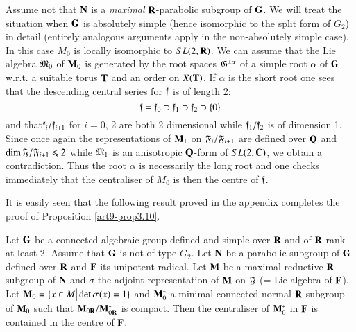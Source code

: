 Assume not that $\mathbf{N}$ is a \textit{maximal} $\mathbf{R}$-parabolic subgroup of $\mathbf{G}$. We will treat the situation when $\mathbf{G}$ is absolutely simple (hence isomorphic to the split form of $G_2$) in detail (entirely analogous arguments apply in the non-absolutely simple case). In this case $M_0$ is locally isomorphic to $SL(2, \mathbf{R})$. We can assume that the Lie algebra $\mathfrak{M}_0$ of $\mathbf{M}_0$ is generated by the root spaces $\mathfrak{G}^{ \pm \alpha}$ of a simple root $\alpha$ of $\mathbf{G}$ w.r.t. a suitable torus $\mathbf{T}$ and an order on $X (\mathbf{T})$. If $\alpha$ is the short root one sees that the descending central series for $\mathfrak{f}$ is of length 2:
$$
\mathfrak{f} = \mathfrak{f}_0 \supset \mathfrak{f}_1 \supset \mathfrak{f}_2 \supset \{0\}
$$
and that\pageoriginale $\mathfrak{f}_i / \mathfrak{f}_{i+1}$ for $i = 0$, 2 are both 2 dimensional while $\mathfrak{f}_1 / \mathfrak{f}_2$ is of dimension 1. Since once again the representations of $\mathbf{M}_1$ on $\mathfrak{F}_i/\mathfrak{F}_{i+1}$ are defined over $\mathbf{Q}$ and $\dim \mathfrak{F}/\mathfrak{F}_{i+1} \leqslant 2$ while $\mathfrak{M}_1$ is an anisotropic  $\mathbf{Q}$-form of $SL (2, \mathbf{C})$, we obtain a contradiction. Thus the root $\alpha$ is necessarily the long root and one checks immediately that the centraliser of $M_0$ is then the centre of $\mathfrak{f}$.

It is easily seen that the following result proved in the appendix completes the proof of Proposition \ref{art9-prop3.10}.

\begin{proposition}\label{art9-prop3.13}
Let $\mathbf{G}$ be a connected algebraic group defined and simple over $\mathbf{R}$ and of $\mathbf{R}$-rank at least 2. Assume that $\mathbf{G}$ is not of type $G_2$. Let $\mathbf{N}$ be a parabolic subgroup of $\mathbf{G}$ defined over $\mathbf{R}$ and $\mathbf{F}$ its unipotent radical. Let $\mathbf{M}$ be a maximal reductive $\mathbf{R}$-subgroup of $\mathbf{N}$ and $\sigma$ the adjoint representation of $\mathbf{M}$ on $\mathfrak{F}$ (= Lie algebra of $\mathbf{F}$). Let $\mathbf{M}_0= \{x \in M \big| \det \sigma (x) = 1\}$ and $\mathbf{M}^\ast_0$ a minimal connected normal $\mathbf{R}$-subgroup of $\mathbf{M}_0$ such that $\mathbf{M}_{0\mathbf{R}} / \mathbf{M}^{\ast}_{0\mathbf{R}}$ is compact. Then the centraliser of $\mathbf{M}^\ast_0$ in $\mathbf{F}$ is contained in the centre of $\mathbf{F}$.
\end{proposition}

\setcounter{subsection}{13}
